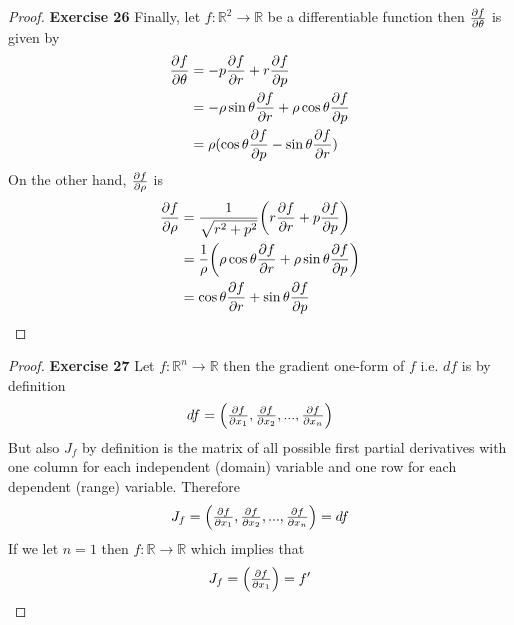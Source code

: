 \documentclass[11pt]{article}
\newcommand{\R}{\mathbb{R}}
\theoremstyle{definition}
\begin{document}
\begin{proof}{\textbf{Exercise 26}}
    Finally, let $f:\R^2 \to \R$ be a differentiable function then
    $\pdv{f}{\theta}$ is given by
    \begin{align*}
        \pdv{f}{\theta} &= -p\pdv{f}{r} + r\pdv{f}{p}\\
        &= -\rho\sin\theta\pdv{f}{r} + \rho\cos\theta\pdv{f}{p}\\
        &= \rho(\cos\theta\pdv{f}{p} - \sin\theta\pdv{f}{r})
    \end{align*}
    On the other hand, $\pdv{f}{\rho}$ is 
    \begin{align*}
        \pdv{f}{\rho}
        &= \frac{1}{\sqrt{r^2 + p^2}}\bigg(r\pdv{f}{r} + p\pdv{f}{p}\bigg)\\
        &= \frac{1}{\rho}\bigg(\rho\cos\theta\pdv{f}{r}
        + \rho\sin\theta\pdv{f}{p}\bigg)\\
        &= \cos\theta\pdv{f}{r} + \sin\theta\pdv{f}{p}
    \end{align*}
\end{proof}
\cleardoublepage
\begin{proof}{\textbf{Exercise 27}}
    Let $f: \R^n \to \R$ then the gradient one-form of $f$ i.e. $df$ is
    by definition
    \begin{align*}
        df = \begin{pmatrix}
            \pdv{f}{x_1}, \pdv{f}{x_2}, ..., \pdv{f}{x_n} 
        \end{pmatrix}
    \end{align*}
    But also $J_f$ by definition is the matrix of all possible first partial
    derivatives with one column for each independent (domain) variable and one
    row for each dependent (range) variable. Therefore
    \begin{align*}
        J_f = \begin{pmatrix}
            \pdv{f}{x_1}, \pdv{f}{x_2}, ..., \pdv{f}{x_n} 
        \end{pmatrix} = df
    \end{align*}
    If we let $n = 1$ then $f:\R \to \R$ which implies that
    \begin{align*}
        J_f = \begin{pmatrix}
            \pdv{f}{x_1} 
        \end{pmatrix} = f'
    \end{align*}
\end{proof}
\end{document}
